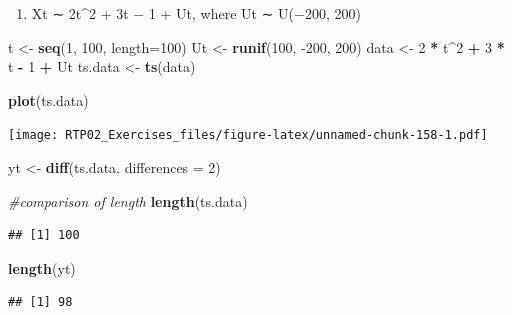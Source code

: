 \documentclass[
]{article}
\newenvironment{Shaded}{\begin{snugshade}}{\end{snugshade}}
\newcommand{\CommentTok}[1]{\textcolor[rgb]{0.56,0.35,0.01}{\textit{#1}}}
\newcommand{\DataTypeTok}[1]{\textcolor[rgb]{0.13,0.29,0.53}{#1}}
\newcommand{\DecValTok}[1]{\textcolor[rgb]{0.00,0.00,0.81}{#1}}
\newcommand{\KeywordTok}[1]{\textcolor[rgb]{0.13,0.29,0.53}{\textbf{#1}}}
\newcommand{\NormalTok}[1]{#1}
\newcommand{\OperatorTok}[1]{\textcolor[rgb]{0.81,0.36,0.00}{\textbf{#1}}}
\newcommand{\StringTok}[1]{\textcolor[rgb]{0.31,0.60,0.02}{#1}}
\providecommand{\tightlist}{%
  \setlength{\itemsep}{0pt}\setlength{\parskip}{0pt}}
\begin{document}
\begin{enumerate}
\def\labelenumi{\alph{enumi})}
\setcounter{enumi}{1}
\tightlist
\item
  Xt ∼ 2t\^{}2 + 3t − 1 + Ut, where Ut ∼ U(−200, 200)
\end{enumerate}

\begin{Shaded}
\begin{Highlighting}[]
\NormalTok{t <-}\StringTok{ }\KeywordTok{seq}\NormalTok{(}\DecValTok{1}\NormalTok{, }\DecValTok{100}\NormalTok{, }\DataTypeTok{length=}\DecValTok{100}\NormalTok{)}
\NormalTok{Ut <-}\StringTok{ }\KeywordTok{runif}\NormalTok{(}\DecValTok{100}\NormalTok{, }\DecValTok{-200}\NormalTok{, }\DecValTok{200}\NormalTok{)}
\NormalTok{data <-}\StringTok{ }\DecValTok{2} \OperatorTok{*}\StringTok{ }\NormalTok{t}\OperatorTok{^}\DecValTok{2} \OperatorTok{+}\StringTok{ }\DecValTok{3} \OperatorTok{*}\StringTok{ }\NormalTok{t }\OperatorTok{-}\StringTok{ }\DecValTok{1} \OperatorTok{+}\StringTok{ }\NormalTok{Ut}
\NormalTok{ts.data <-}\StringTok{ }\KeywordTok{ts}\NormalTok{(data)}

\KeywordTok{plot}\NormalTok{(ts.data)}
\end{Highlighting}
\end{Shaded}

\texttt{[image: RTP02\_Exercises\_files/figure-latex/unnamed-chunk-158-1.pdf]}

\begin{Shaded}
\begin{Highlighting}[]
\NormalTok{yt <-}\StringTok{ }\KeywordTok{diff}\NormalTok{(ts.data, }\DataTypeTok{differences =} \DecValTok{2}\NormalTok{)}

\CommentTok{#comparison of length}
\KeywordTok{length}\NormalTok{(ts.data)}
\end{Highlighting}
\end{Shaded}

\begin{verbatim}
## [1] 100
\end{verbatim}

\begin{Shaded}
\begin{Highlighting}[]
\KeywordTok{length}\NormalTok{(yt)}
\end{Highlighting}
\end{Shaded}

\begin{verbatim}
## [1] 98
\end{verbatim}
\end{document}
